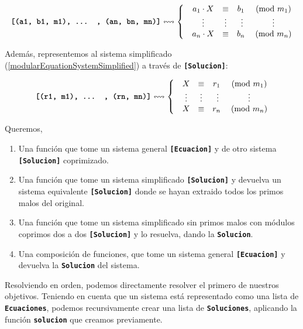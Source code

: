 \documentclass{article}
\newcommand{\mono}[1]{\textbf{\texttt{#1}}}
\newcommand{\nln}{\par\vspace{3mm}}
\begin{document}
\begin{equation*}
\text{\mono{[(a1, b1, m1), ... , (an, bn, mn)]}}\leftrightsquigarrow
\left\{\begin{matrix}
 &a_1 \cdot X &\equiv &b_1 \; &(\text{mod } m_1)  \\
 &\vdots      &\vdots &\vdots &\vdots             \\
 &a_n \cdot X &\equiv &b_n \; &(\text{mod } m_n)  \\
\end{matrix}\right. 
\end{equation*}

Además, representemos al sistema simplificado (\ref{modularEquationSystemSimplified}) a través de \mono{[Solucion]}:

\begin{equation*}
\text{\mono{[(r1, m1), ... , (rn, mn)]}}\leftrightsquigarrow
\left\{\begin{matrix}
 &X &\equiv &r_1 \; &(\text{mod } m_1)  \\
 &\vdots      &\vdots &\vdots &\vdots   \\
 &X &\equiv &r_n \; &(\text{mod } m_n)  \\
\end{matrix}\right. 
\end{equation*}
\nln
Queremos,

\begin{enumerate}
    \item Una función que tome un sistema general \mono{[Ecuacion]} y de otro sistema \mono{[Solucion]} coprimizado.
    
    \item Una función que tome un sistema simplificado \mono{[Solucion]} y devuelva un sistema equivalente \mono{[Solucion]} donde se hayan extraido todos los primos malos del original.
    
    \item Una función que tome un sistema simplificado sin primos malos con módulos coprimos dos a dos \mono{[Solucion]} y lo resuelva, dando la \mono{Solucion}.
    
    \item Una composición de funciones, que tome un sistema general \mono{[Ecuacion]} y devuelva la \mono{Solucion} del sistema.
\end{enumerate}
\newpage

Resolviendo en orden, podemos directamente resolver el primero de nuestros objetivos.
Teniendo en cuenta que un sistema está representado como una lista de \mono{Ecuaciones}, podemos recursivamente crear una lista de \mono{Soluciones}, aplicando la función \mono{solucion} que creamos previamente.
\end{document}
